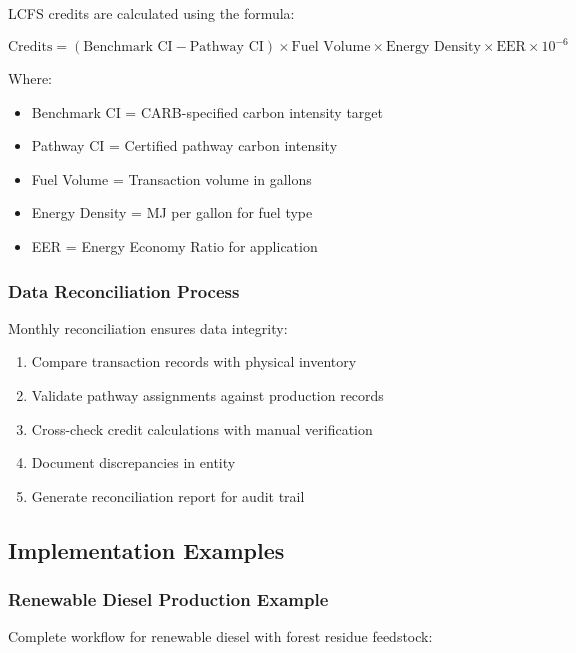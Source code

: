 LCFS credits are calculated using the formula:

\begin{equation}
\text{Credits} = (\text{Benchmark CI} - \text{Pathway CI}) \times \text{Fuel Volume} \times \text{Energy Density} \times \text{EER} \times 10^{-6}
\end{equation}

Where:
\begin{itemize}
    \item Benchmark CI = CARB-specified carbon intensity target
    \item Pathway CI = Certified pathway carbon intensity
    \item Fuel Volume = Transaction volume in gallons
    \item Energy Density = MJ per gallon for fuel type
    \item EER = Energy Economy Ratio for application
\end{itemize}

\subsubsection{Data Reconciliation Process}

Monthly reconciliation ensures data integrity:

\begin{enumerate}
    \item Compare transaction records with physical inventory
    \item Validate pathway assignments against production records
    \item Cross-check credit calculations with manual verification
    \item Document discrepancies in  entity
    \item Generate reconciliation report for audit trail
\end{enumerate}

\subsection{Implementation Examples}
\label{sec:lcfs-examples}

\subsubsection{Renewable Diesel Production Example}

Complete workflow for renewable diesel with forest residue feedstock:


